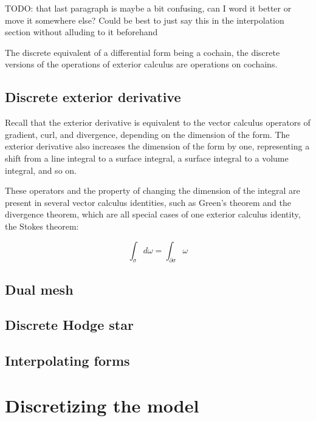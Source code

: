 \documentclass[utf8,english]{gradu3}
\begin{document}
TODO: that last paragraph is maybe a bit confusing,
can I word it better or move it somewhere else?
Could be best to just say this in the interpolation section
without alluding to it beforehand

The discrete equivalent of a differential form being a cochain,
the discrete versions of the operations of exterior calculus
are operations on cochains.

\subsection{Discrete exterior derivative}\label{disc_ext_der}

Recall that the exterior derivative
is equivalent to the vector calculus operators
of gradient, curl, and divergence, depending on the dimension of the form.
The exterior derivative also increases the dimension of the form by one,
representing a shift from a line integral to a surface integral,
a surface integral to a volume integral, and so on.

These operators and the property of changing the dimension of the integral
are present in several vector calculus identities,
such as Green's theorem and the divergence theorem,
which are all special cases of one exterior calculus identity,
the Stokes theorem:

\begin{equation}
  \int_{\sigma} d\omega = \int_{\partial\sigma} \omega
\end{equation}


\subsection{Dual mesh}\label{dual_mesh}

\subsection{Discrete Hodge star}

\subsection{Interpolating forms}\label{interpolation}

\section{Discretizing the model}
\end{document}
